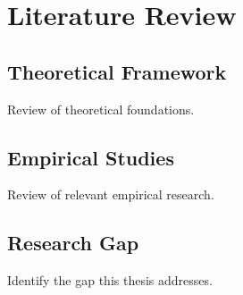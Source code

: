 \chapter{Literature Review}
\label{chap:literature_review}

\section{Theoretical Framework}

Review of theoretical foundations.

\section{Empirical Studies}

Review of relevant empirical research.

\section{Research Gap}

Identify the gap this thesis addresses.
